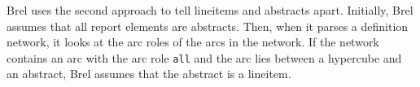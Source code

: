Brel uses the second approach to tell lineitems and abstracts apart.
Initially, Brel assumes that all report elements are abstracts.
Then, when it parses a definition network, it looks at the arc roles of the arcs in the network.
If the network contains an arc with the arc role \texttt{all} and the arc lies between a hypercube and an abstract, Brel assumes that the abstract is a lineitem.


